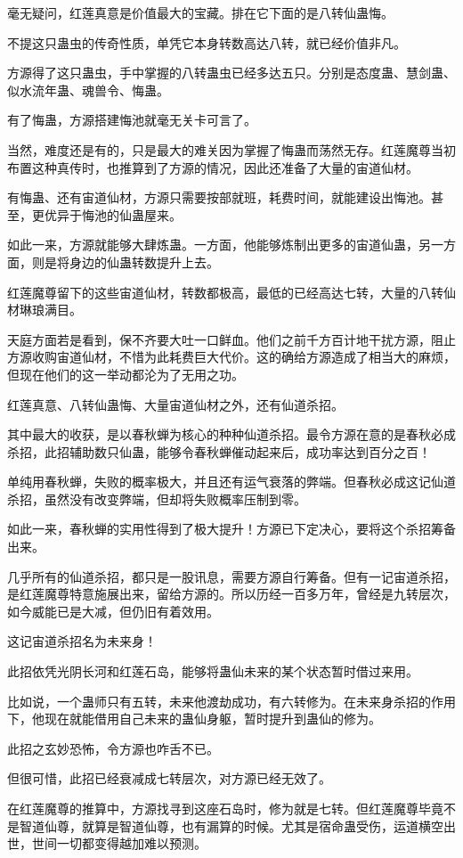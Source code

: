 \begin{this_body}
毫无疑问，红莲真意是价值最大的宝藏。排在它下面的是八转仙蛊悔。

不提这只蛊虫的传奇性质，单凭它本身转数高达八转，就已经价值非凡。

方源得了这只蛊虫，手中掌握的八转蛊虫已经多达五只。分别是态度蛊、慧剑蛊、似水流年蛊、魂兽令、悔蛊。

有了悔蛊，方源搭建悔池就毫无关卡可言了。

当然，难度还是有的，只是最大的难关因为掌握了悔蛊而荡然无存。红莲魔尊当初布置这种真传时，也推算到了方源的情况，因此还准备了大量的宙道仙材。

有悔蛊、还有宙道仙材，方源只需要按部就班，耗费时间，就能建设出悔池。甚至，更优异于悔池的仙蛊屋来。

如此一来，方源就能够大肆炼蛊。一方面，他能够炼制出更多的宙道仙蛊，另一方面，则是将身边的仙蛊转数提升上去。

红莲魔尊留下的这些宙道仙材，转数都极高，最低的已经高达七转，大量的八转仙材琳琅满目。

天庭方面若是看到，保不齐要大吐一口鲜血。他们之前千方百计地干扰方源，阻止方源收购宙道仙材，不惜为此耗费巨大代价。这的确给方源造成了相当大的麻烦，但现在他们的这一举动都沦为了无用之功。

红莲真意、八转仙蛊悔、大量宙道仙材之外，还有仙道杀招。

其中最大的收获，是以春秋蝉为核心的种种仙道杀招。最令方源在意的是春秋必成杀招，此招辅助数只仙蛊，能够令春秋蝉催动起来后，成功率达到百分之百！

单纯用春秋蝉，失败的概率极大，并且还有运气衰落的弊端。但春秋必成这记仙道杀招，虽然没有改变弊端，但却将失败概率压制到零。

如此一来，春秋蝉的实用性得到了极大提升！方源已下定决心，要将这个杀招筹备出来。

几乎所有的仙道杀招，都只是一股讯息，需要方源自行筹备。但有一记宙道杀招，是红莲魔尊特意施展出来，留给方源的。所以历经一百多万年，曾经是九转层次，如今威能已是大减，但仍旧有着效用。

这记宙道杀招名为未来身！

此招依凭光阴长河和红莲石岛，能够将蛊仙未来的某个状态暂时借过来用。

比如说，一个蛊师只有五转，未来他渡劫成功，有六转修为。在未来身杀招的作用下，他现在就能借用自己未来的蛊仙身躯，暂时提升到蛊仙的修为。

此招之玄妙恐怖，令方源也咋舌不已。

但很可惜，此招已经衰减成七转层次，对方源已经无效了。

在红莲魔尊的推算中，方源找寻到这座石岛时，修为就是七转。但红莲魔尊毕竟不是智道仙尊，就算是智道仙尊，也有漏算的时候。尤其是宿命蛊受伤，运道横空出世，世间一切都变得越加难以预测。


\end{this_body}
